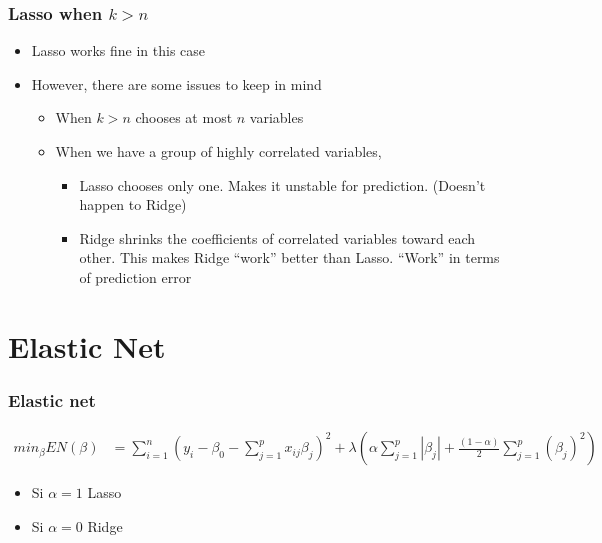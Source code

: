 \documentclass[
  shownotes,
  xcolor={svgnames},
  hyperref={colorlinks,citecolor=DarkBlue,linkcolor=andesred,urlcolor=DarkBlue}
  , aspectratio=169]{beamer}
\begin{document}
\begin{frame}[fragile]
\frametitle{Lasso when $k>n$}

\begin{itemize}
  \item Lasso works fine in this case
  \medskip
  \item However, there are some issues to keep in mind
  \begin{itemize}
    \medskip
  \item When $k>n$ chooses at most $n$ variables
  \medskip
  \item When we have a group of highly correlated variables, 
  \medskip
    \begin{itemize}
      \item Lasso chooses only one. Makes it unstable for prediction. (Doesn't happen to Ridge)
      \medskip
      \item Ridge shrinks the coefficients of correlated variables toward each other. This makes Ridge ``work'' better than Lasso. ``Work'' in terms of prediction error
    \end{itemize}
  \end{itemize}  
  \medskip
  
\end{itemize}



\end{frame}


\section{Elastic Net}
\begin{frame}[fragile]
\frametitle{Elastic net}



\begin{align}
min_{\beta} EN(\beta) &= \sum_{i=1}^n (y_i-\beta_0 - \sum_{j=1}^p x_{ij}\beta_j)^2  + \lambda\left(\alpha \sum_{j=1}^p |\beta_j| + \frac{(1-\alpha)}{2} \sum_{j=1}^p (\beta_j)^2\right)
\end{align}


\begin{itemize}
 \item Si $\alpha=1$ Lasso
 \medskip
 \item Si $\alpha=0$ Ridge 
\end{itemize}

\end{frame}
\end{document}
